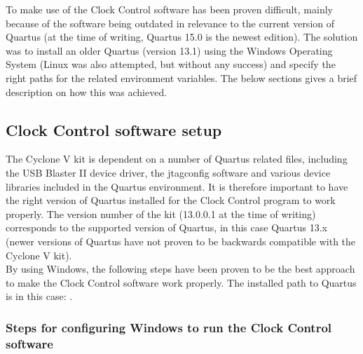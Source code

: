 \documentclass[main.tex]{subfiles}
\begin{document}
To make use of the Clock Control software has been proven difficult, mainly because of the software being outdated in relevance to the current version of Quartus (at the time of writing, Quartus 15.0 is the newest edition). The solution was to install an older Quartus (version 13.1) using the Windows Operating System (Linux was also attempted, but without any success) and specify the right paths for the related environment variables. The below sections gives a brief description on how this was achieved.\\

\subsection{Clock Control software setup}

The Cyclone V kit is dependent on a number of Quartus related files, including the USB Blaster II device driver, the jtagconfig software and various device libraries included in the Quartus environment. It is therefore important to have the right version of Quartus installed for the Clock Control program to work properly. The version number of the kit (13.0.0.1 at the time of writing) corresponds to the supported version of Quartus, in this case Quartus 13.x (newer versions of Quartus have not proven to be backwards compatible with the Cyclone V kit).\\

By using Windows, the following steps have been proven to be the best approach to make the Clock Control software work properly. The installed path to Quartus is in this case: .\\

\subsubsection{Steps for configuring Windows to run the Clock Control software}
\end{document}
